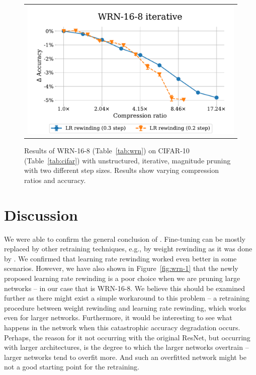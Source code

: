 \begin{figure}[H]
\setlength{\tabcolsep}{0pt}
  \begin{center}
    \begin{tabular}{c}
      \includegraphics[width=0.7\linewidth]{pics/WRN-16-8-LR-rew-compare2v3.pdf}\\
    \end{tabular}
  \end{center}
\caption{Results of WRN-16-8 (Table~\ref{tab:wrn}) on CIFAR-10 (Table~\ref{tab:cifar}) with unstructured, iterative, magnitude pruning with two different step sizes. Results show varying compression ratios and accuracy.}
\label{fig:wrn-2}
\end{figure}

\section{Discussion}

We were able to confirm the general conclusion of \cite{Renda}. Fine-tuning can be mostly replaced by other retraining techniques, e.g., by weight rewinding as it was done by \cite{Frankle}. We confirmed that learning rate rewinding worked even better in some scenarios. However, we have also shown in Figure~\ref{fig:wrn-1} that the newly proposed learning rate rewinding is a poor choice when we are pruning large networks -- in our case that is WRN-16-8. We believe this should be examined further as there might exist a simple workaround to this problem -- a retraining procedure between weight rewinding and learning rate rewinding, which works even for larger networks. Furthermore, it would be interesting to see what happens in the network when this catastrophic accuracy degradation occurs. Perhaps, the reason for it not occurring with the original ResNet, but occurring with larger architectures, is the degree to which the larger networks overtrain -- larger networks tend to overfit more. And such an overfitted network might be not a good starting point for the retraining.

